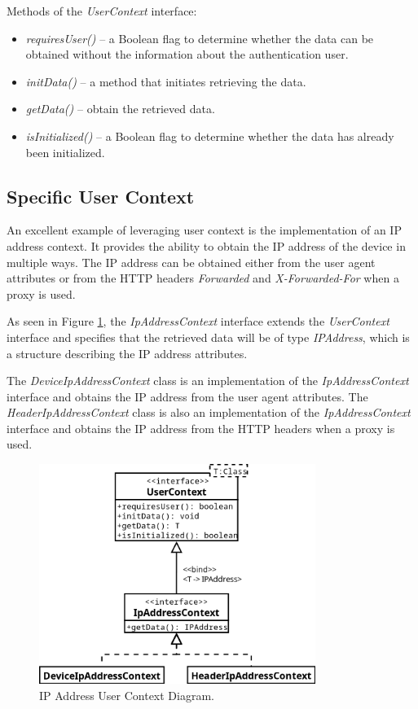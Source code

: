 \newpage

Methods of the \textit{UserContext} interface:
\begin{itemize}
    \item \textit{requiresUser()} -- a Boolean flag to determine whether the data can be obtained without the information about the authentication user.
    \item \textit{initData()} -- a method that initiates retrieving the data.
    \item \textit{getData()} -- obtain the retrieved data. 
    \item \textit{isInitialized()} -- a Boolean flag to determine whether the data has already been initialized. 
\end{itemize}

\subsection{Specific User Context}
An excellent example of leveraging user context is the implementation of an IP address context.
It provides the ability to obtain the IP address of the device in multiple ways.
The IP address can be obtained either from the user agent attributes or from the HTTP headers \textit{Forwarded} and \textit{X-Forwarded-For} when a proxy is used.

As seen in Figure \ref{fig:user-context-ip-address-context}, the \textit{IpAddressContext} interface extends the \textit{UserContext} interface and specifies that the retrieved data will be of type \textit{IPAddress}, which is a structure describing the IP address attributes.

The \textit{DeviceIpAddressContext} class is an implementation of the \textit{IpAddressContext} interface and obtains the IP address from the user agent attributes.
The \textit{HeaderIpAddressContext} class is also an implementation of the \textit{IpAddressContext} interface and obtains the IP address from the HTTP headers when a proxy is used.

\begin{figure}[htbp]
  \centering
  \includegraphics[width=0.8\textwidth]{img/sections/5-design/ipAddressContext.png}
  \caption{IP Address User Context Diagram.}
  \label{fig:user-context-ip-address-context}
\end{figure}

